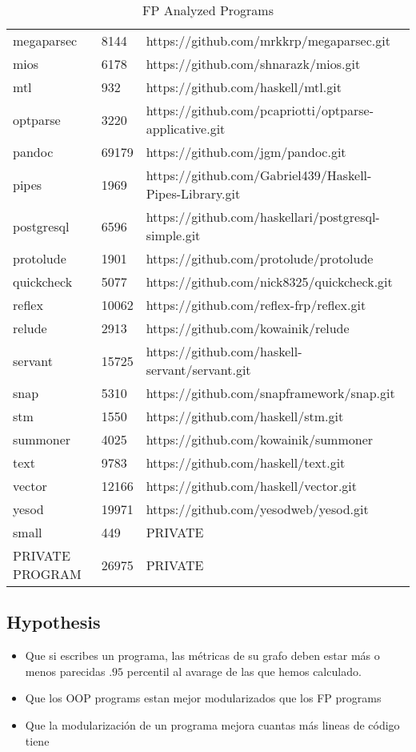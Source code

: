 \documentclass[12pt, a4paper]{article}
\begin{document}
\begin{table}[H]
\begin{tabular}{l l l}
        megaparsec & 8144 & https://github.com/mrkkrp/megaparsec.git \\
        mios & 6178 & https://github.com/shnarazk/mios.git \\
        mtl & 932 & https://github.com/haskell/mtl.git \\
        optparse & 3220 & https://github.com/pcapriotti/optparse-applicative.git \\
        pandoc & 69179 & https://github.com/jgm/pandoc.git \\
        pipes & 1969 & https://github.com/Gabriel439/Haskell-Pipes-Library.git \\
        postgresql & 6596 & https://github.com/haskellari/postgresql-simple.git \\
        protolude & 1901 & https://github.com/protolude/protolude \\
        quickcheck & 5077 & https://github.com/nick8325/quickcheck.git \\
        reflex & 10062 & https://github.com/reflex-frp/reflex.git \\
        relude & 2913 & https://github.com/kowainik/relude \\
        servant & 15725 & https://github.com/haskell-servant/servant.git \\
        snap & 5310 & https://github.com/snapframework/snap.git \\
        stm & 1550 & https://github.com/haskell/stm.git \\
        summoner & 4025 & https://github.com/kowainik/summoner \\
        text & 9783 & https://github.com/haskell/text.git \\
        vector & 12166 & https://github.com/haskell/vector.git \\
        yesod & 19971 & https://github.com/yesodweb/yesod.git \\
        small & 449 & PRIVATE \\
        PRIVATE PROGRAM & 26975 & PRIVATE \\

    \end{tabular}
    \caption{FP Analyzed Programs}
    \label{table:fp_prog_1}
\end{table}

\subsection{Hypothesis}

\begin{itemize}
    \item Que si escribes un programa, las métricas de su grafo deben estar más o menos parecidas $.95$ percentil al avarage de las que hemos calculado.
    \item Que los OOP programs estan mejor modularizados que los FP programs
    \item Que la modularización de un programa mejora cuantas más lineas de código tiene
\end{itemize}
\end{document}
